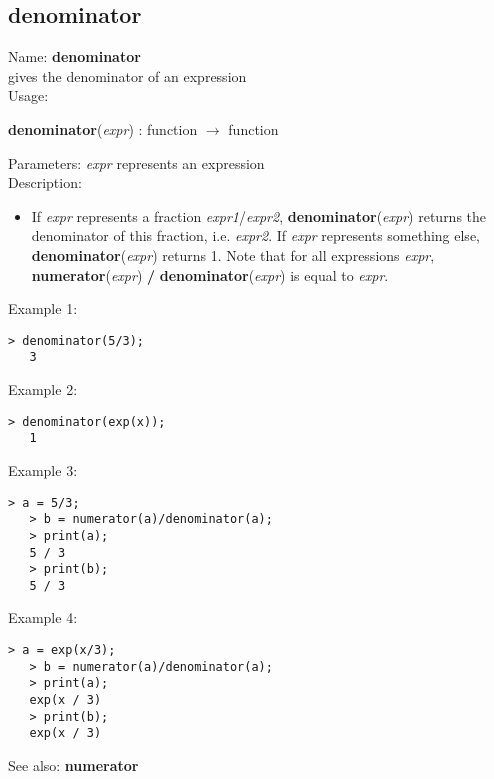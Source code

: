 \subsection{ denominator }
\noindent Name: \textbf{denominator}\\
gives the denominator of an expression\\

\noindent Usage: 
\begin{center}
\textbf{denominator}(\emph{expr}) : \textsf{function} $\rightarrow$ \textsf{function}\\
\end{center}
Parameters: 
\emph{expr} represents an expression\\

\noindent Description: \begin{itemize}

\item If \emph{expr} represents a fraction \emph{expr1}/\emph{expr2}, \textbf{denominator}(\emph{expr})
   returns the denominator of this fraction, i.e. \emph{expr2}.
   If \emph{expr} represents something else, \textbf{denominator}(\emph{expr}) 
   returns 1.
   Note that for all expressions \emph{expr}, \textbf{numerator}(\emph{expr}) \textbf{/} \textbf{denominator}(\emph{expr})
   is equal to \emph{expr}.
\end{itemize}
\noindent Example 1: 
\begin{center}\begin{minipage}{14.8cm}\begin{Verbatim}[frame=single]
   > denominator(5/3);
   3
\end{Verbatim}
\end{minipage}\end{center}
\noindent Example 2: 
\begin{center}\begin{minipage}{14.8cm}\begin{Verbatim}[frame=single]
   > denominator(exp(x));
   1
\end{Verbatim}
\end{minipage}\end{center}
\noindent Example 3: 
\begin{center}\begin{minipage}{14.8cm}\begin{Verbatim}[frame=single]
   > a = 5/3;
   > b = numerator(a)/denominator(a);
   > print(a);
   5 / 3
   > print(b);
   5 / 3
\end{Verbatim}
\end{minipage}\end{center}
\noindent Example 4: 
\begin{center}\begin{minipage}{14.8cm}\begin{Verbatim}[frame=single]
   > a = exp(x/3);
   > b = numerator(a)/denominator(a);
   > print(a);
   exp(x / 3)
   > print(b);
   exp(x / 3)
\end{Verbatim}
\end{minipage}\end{center}
See also: \textbf{numerator}
